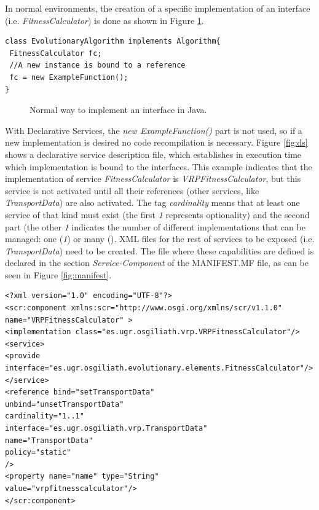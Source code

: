 In normal environments, the creation of a specific implementation of an interface (i.e. {\em FitnessCalculator}) is done as shown in Figure \ref{fig:normalImp}.

\newsavebox{\mintedboxOSGIinst}
\begin{lrbox}{\mintedboxOSGIinst}
\begin{minipage}{10cm}
\begin{verbatim}
class EvolutionaryAlgorithm implements Algorithm{
 FitnessCalculator fc;
 //A new instance is bound to a reference
 fc = new ExampleFunction();
}
\end{verbatim}
\end{minipage}
\end{lrbox}

\begin{figure}
\usebox{\mintedboxOSGIinst}
\caption{Normal way to implement an interface in Java.} 
\label{fig:normalImp} 
\end{figure}


With Declarative Services, the {\em new ExampleFunction()} part is not used, so if a new implementation is desired no code recompilation is necessary.  Figure \ref{fig:ds} shows a declarative service description file, which establishes in execution time which implementation is bound to the interfaces. This example indicates that the implementation of service {\em FitnessCalculator} is {\em VRPFitnessCalculator}, but this service is not activated until all their references (other services, like {\em TransportData}) are also activated. The tag {\em cardinality} means that at least one service of that kind must exist (the first {\em 1} represents optionality) and  the second part (the other {\em 1} indicates the number of different implementations that can be managed: one ({\em 1}) or many ({\em *}).  XML files for the rest of services to be exposed (i.e. {\em TransportData}) need to be created. The file where these capabilities are defined is declared in the section {\em Service-Component} of the MANIFEST.MF file, as can be seen in Figure \ref{fig:manifest}.



\newsavebox{\mintedboxOSGIDS}
\begin{lrbox}{\mintedboxOSGIDS}
\begin{minipage}{10cm}
\begin{verbatim}
<?xml version="1.0" encoding="UTF-8"?>
<scr:component xmlns:scr="http://www.osgi.org/xmlns/scr/v1.1.0"
name="VRPFitnessCalculator" >
<implementation class="es.ugr.osgiliath.vrp.VRPFitnessCalculator"/>
<service>
<provide 
interface="es.ugr.osgiliath.evolutionary.elements.FitnessCalculator"/>
</service>
<reference bind="setTransportData"
unbind="unsetTransportData"
cardinality="1..1"
interface="es.ugr.osgiliath.vrp.TransportData"
name="TransportData"
policy="static"
/>
<property name="name" type="String"
value="vrpfitnesscalculator"/>
</scr:component>
\end{verbatim}
\end{minipage}
\end{lrbox}


